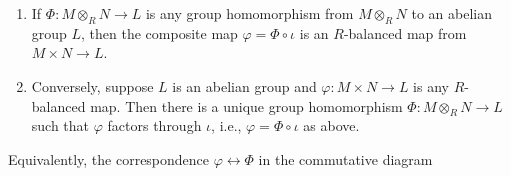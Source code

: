 \documentclass[../notes.tex]{subfiles}
\begin{document}
\begin{itemize}
\begin{theorem}
        \begin{enumerate}
            \item If $\Phi:M\otimes_RN\to L$ is any group homomorphism from $M\otimes_RN$ to an abelian group $L$, then the composite map $\varphi=\Phi\circ\iota$ is an $R$-balanced map from $M\times N\to L$.
            \item Conversely, suppose $L$ is an abelian group and $\varphi:M\times N\to L$ is any $R$-balanced map. Then there is a unique group homomorphism $\Phi:M\otimes_RN\to L$ such that $\varphi$ factors through $\iota$, i.e., $\varphi=\Phi\circ\iota$ as above.
        \end{enumerate}
        Equivalently, the correspondence $\varphi\leftrightarrow\Phi$ in the commutative diagram
        \begin{figure}[H]
            \centering
\end{figure}
\end{theorem}
\end{itemize}
\end{document}

